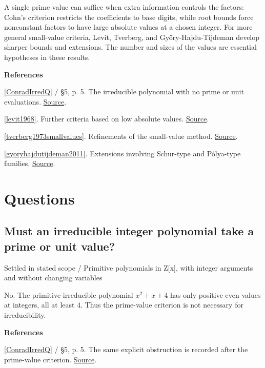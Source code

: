 \documentclass[11pt,a4paper,oneside,openany]{book}
\newenvironment{sources}{\par\smallskip\begingroup\footnotesize\color{atlasgray}\leftskip=10pt\setlength{\parskip}{2pt}}{\par\endgroup\smallskip}
\begin{document}
\color{black} A single prime value can suffice when extra information controls the factors: Cohn's criterion restricts the coefficients to base digits, while root bounds force nonconstant factors to have large absolute values at a chosen integer. For more general small-value criteria, Levit, Tverberg, and Győry-Hajdu-Tijdeman develop sharper bounds and extensions. The number and sizes of the values are essential hypotheses in these results.\par
\begin{sources}
\textbf{References}\par\smallskip
\noindent\hyperlink{ref:ConradIrredQ}{[ConradIrredQ]} / §5, p. 5. The irreducible polynomial with no prime or unit evaluations. \href{https://kconrad.math.uconn.edu/blurbs/ringtheory/irredtestsoverQ.pdf}{Source}.\par
\noindent\hyperlink{ref:levit1968}{[levit1968]}. Further criteria based on low absolute values. \href{https://www.jstor.org/stable/1994841}{Source}.\par
\noindent\hyperlink{ref:tverberg1973smallvalues}{[tverberg1973smallvalues]}. Refinements of the small-value method. \href{https://journals.msp.org/mscand/article/view/2165}{Source}.\par
\noindent\hyperlink{ref:gyoryhajdutijdeman2011}{[gyoryhajdutijdeman2011]}. Extensions involving Schur-type and Pólya-type families. \href{https://link.springer.com/article/10.1007/s00605-010-0241-9}{Source}.\par
\end{sources}\color{black}
\section*{Questions}
\subsection*{Must an irreducible integer polynomial take a prime or unit value?}
{\small\sffamily\color{atlasgold}Settled in stated scope / Primitive polynomials in Z[x], with integer arguments and without changing variables}\par\smallskip
\color{black} No. The primitive irreducible polynomial \(x^2+x+4\) has only positive even values at integers, all at least \(4\). Thus the prime-value criterion is not necessary for irreducibility.\par
\begin{sources}
\textbf{References}\par\smallskip
\noindent\hyperlink{ref:ConradIrredQ}{[ConradIrredQ]} / §5, p. 5. The same explicit obstruction is recorded after the prime-value criterion. \href{https://kconrad.math.uconn.edu/blurbs/ringtheory/irredtestsoverQ.pdf}{Source}.\par
\end{sources}\color{black}
\end{document}
